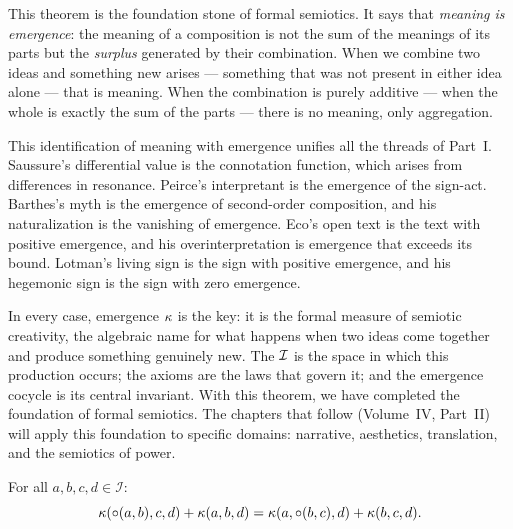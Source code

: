 \begin{interpretation}
This theorem is the foundation stone of formal semiotics. It says that
\emph{meaning is emergence}: the meaning of a composition is not the
sum of the meanings of its parts but the \emph{surplus} generated by
their combination. When we combine two ideas and something new arises
--- something that was not present in either idea alone --- that is
meaning. When the combination is purely additive --- when the whole is
exactly the sum of the parts --- there is no meaning, only aggregation.

This identification of meaning with emergence unifies all the threads
of Part~I. Saussure's differential value is the connotation function,
which arises from differences in resonance. Peirce's interpretant is
the emergence of the sign-act. Barthes's myth is the emergence of
second-order composition, and his naturalization is the vanishing of
emergence. Eco's open text is the text with positive emergence, and
his overinterpretation is emergence that exceeds its bound. Lotman's
living sign is the sign with positive emergence, and his hegemonic
sign is the sign with zero emergence.

In every case, emergence $\kappa$ is the key: it is the formal
measure of semiotic creativity, the algebraic name for what happens
when two ideas come together and produce something genuinely new. The
$\mathcal{I}$ is the space in which this production occurs; the axioms are the
laws that govern it; and the emergence cocycle is its central
invariant. With this theorem, we have completed the foundation of
formal semiotics. The chapters that follow (Volume~IV, Part~II) will
apply this foundation to specific domains: narrative, aesthetics,
translation, and the semiotics of power.
\end{interpretation}

\begin{theorem}
\label{thm:master-cocycle}
For all $a, b, c, d \in \mathcal{I}$:
\[
  \kappa(\circ(a, b), c, d) + \kappa(a, b, d)
  = \kappa(a, \circ(b, c), d) + \kappa(b, c, d).
\]
\end{theorem}

